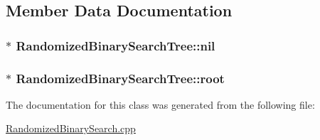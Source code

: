 \subsection{Member Data Documentation}
\subsubsection[{\texorpdfstring{nil}{nil}}]{$\ast$ Randomized\+Binary\+Search\+Tree\+::nil\hspace{0.3cm}{\ttfamily [private]}}\hypertarget{classRandomizedBinarySearchTree_a40d1d6c2aa7c91e83570f92a47836fab}{}\label{classRandomizedBinarySearchTree_a40d1d6c2aa7c91e83570f92a47836fab}
\subsubsection[{\texorpdfstring{root}{root}}]{$\ast$ Randomized\+Binary\+Search\+Tree\+::root\hspace{0.3cm}{\ttfamily [private]}}\hypertarget{classRandomizedBinarySearchTree_a3040b63f8697ac073513f5e90ddc9e47}{}\label{classRandomizedBinarySearchTree_a3040b63f8697ac073513f5e90ddc9e47}


The documentation for this class was generated from the following file\+:\begin{DoxyCompactItemize}
\item 
\hyperlink{RandomizedBinarySearch_8cpp}{Randomized\+Binary\+Search.\+cpp}\end{DoxyCompactItemize}
